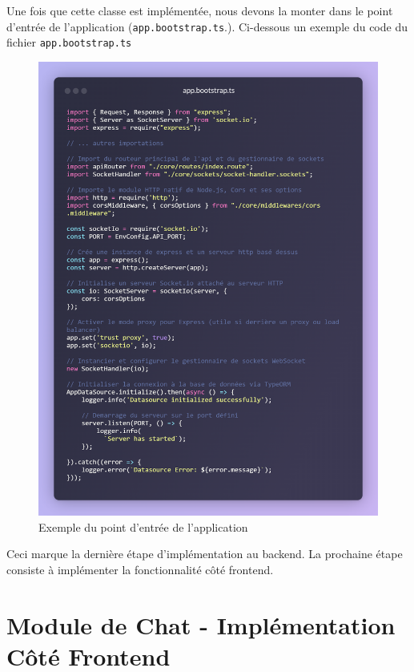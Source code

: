 \clearpage

\vspace{1cm}

Une fois que cette classe est implémentée, nous devons la monter dans le point d'entrée de l'application (\verb|app.bootstrap.ts|.). Ci-dessous un exemple du code du fichier \verb|app.bootstrap.ts|

\vspace{0.35cm}

\begin{figure}[H]
    \centering
    \includegraphics[width=15cm]{assets/annexes/snippet (13).png}
    \caption{ Exemple du point d'entrée de l'application}
\end{figure}

Ceci marque la dernière étape d'implémentation au backend. La prochaine étape consiste à implémenter la fonctionnalité côté frontend. 

\section{Module de Chat - Implémentation Côté Frontend}

